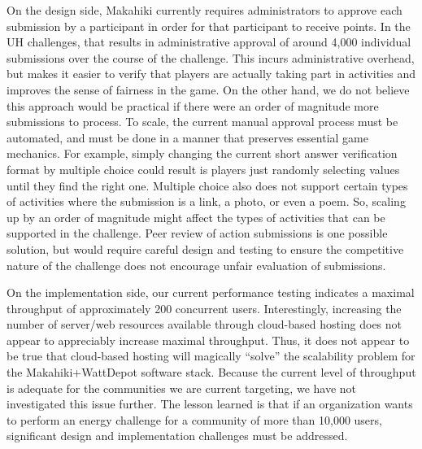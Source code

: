 On the design side, Makahiki currently requires administrators to approve each submission by a participant in order for that participant to receive points.   In the UH challenges, that results in administrative approval of around 4,000 individual submissions over the course of the challenge.  This incurs administrative overhead, but makes it easier to verify that players are actually taking part in activities and improves the sense of fairness in the game.  On the other hand, we do not believe this approach would be practical if there were an order of magnitude more submissions to process.  To scale, the current manual approval process must be automated, and must be done in a manner that preserves essential game mechanics.  For example, simply changing the current short answer verification format by multiple choice could result is players just randomly selecting values until they find the right one.  Multiple choice also does not support certain types of activities where the submission is a link, a photo, or even a poem.  So, scaling up by an order of magnitude might affect the types of activities that can be supported in the challenge. Peer review of action submissions is one possible solution, but would require careful design and testing to ensure the competitive nature of the challenge does not encourage unfair evaluation of submissions.

On the implementation side, our current performance testing indicates a maximal throughput of approximately 200 concurrent users.  Interestingly, increasing the number of server/web resources available through cloud-based hosting does not appear to appreciably increase maximal throughput.  Thus, it does not appear to be true that cloud-based hosting will magically ``solve'' the scalability problem for the Makahiki+WattDepot software stack.  Because the current level of throughput is adequate for the communities we are current targeting, we have not investigated this issue further.  The lesson learned is that if an organization wants to perform an energy challenge for a community of more than 10,000 users, significant design and implementation challenges must be addressed.
